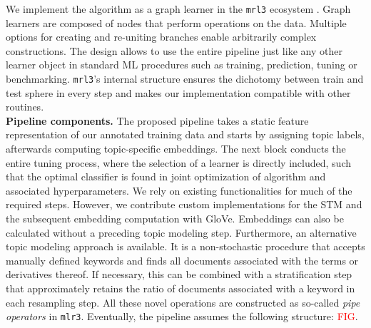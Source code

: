 We implement the algorithm as a graph learner in the \texttt{mrl3} ecosystem
\citep{pkgmlr3}.
Graph learners are composed of nodes that perform operations on the data.
Multiple options for creating and re-uniting branches enable arbitrarily 
complex constructions.
The design allows to use the entire pipeline just like any other learner object 
in standard ML procedures such as training, prediction, tuning or benchmarking.
\texttt{mrl3}'s internal structure ensures the dichotomy between train and test 
sphere in every step and makes our implementation compatible with other
routines.
\\

\textbf{Pipeline components.}
The proposed pipeline takes a static feature representation of our annotated 
training data and starts by assigning topic labels, afterwards computing 
topic-specific embeddings.
The next block conducts the entire tuning process, where the 
selection of a learner is directly included, such that the optimal classifier is 
found in joint optimization of algorithm and associated hyperparameters.
We rely on existing functionalities for much of the required steps.
However, we contribute custom implementations for the STM and the subsequent 
embedding computation with GloVe.
Embeddings can also be calculated without a preceding topic modeling step.
Furthermore, an alternative topic modeling approach is available. 
It is a non-stochastic procedure that accepts manually defined keywords and 
finds all documents associated with the terms or derivatives thereof.
If necessary, this can be combined with a stratification step that approximately 
retains the ratio of documents associated with a keyword in each resampling 
step.
All these novel operations are constructed as so-called \textit{pipe operators}
in \texttt{mlr3}.
Eventually, the pipeline assumes the following structure: \textcolor{red}{FIG}.
\\

